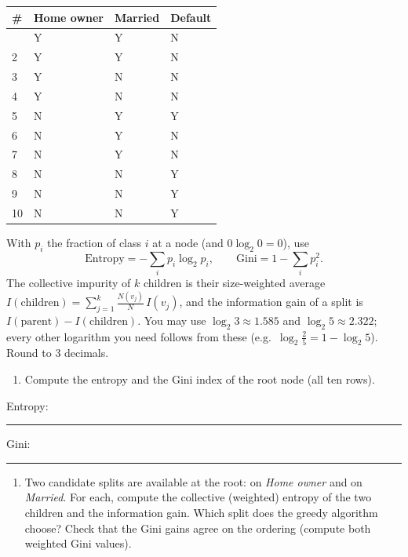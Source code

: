 \documentclass[
  11pt,
]{article}
\newcounter{none} %
\providecommand{\tightlist}{%
  \setlength{\itemsep}{0pt}\setlength{\parskip}{0pt}}
\newcommand{\answerspace}[1]{\par\vspace*{#1}}  %
\newcommand{\blank}[1][1.2in]{\rule{#1}{0.4pt}}
\newcommand{\answerpage}{\clearpage}
\begin{document}
{\def\LTcaptype{none} %
\begin{longtable}[]{@{}llll@{}}
\toprule\noalign{}
\# & Home owner & Married & Default \\
\midrule\noalign{}
\endhead
\bottomrule\noalign{}
\endlastfoot
1 & Y & Y & N \\
2 & Y & Y & N \\
3 & Y & N & N \\
4 & Y & N & N \\
5 & N & Y & Y \\
6 & N & Y & N \\
7 & N & Y & N \\
8 & N & N & Y \\
9 & N & N & Y \\
10 & N & N & Y \\
\end{longtable}
}

With \(p_i\) the fraction of class \(i\) at a node (and
\(0\log_2 0 = 0\)), use
\[\text{Entropy}=-\sum_i p_i\log_2 p_i,\qquad \text{Gini}=1-\sum_i p_i^2 .\]
The collective impurity of \(k\) children is their size-weighted average
\(I(\text{children})=\sum_{j=1}^{k}\frac{N(v_j)}{N}\,I(v_j)\), and the
information gain of a split is \(I(\text{parent})-I(\text{children})\).
You may use \(\log_2 3 \approx 1.585\) and \(\log_2 5 \approx 2.322\);
every other logarithm you need follows from these
(e.g.~\(\log_2\tfrac{2}{5} = 1 - \log_2 5\)). Round to 3 decimals.

\begin{enumerate}
\def\labelenumi{(\alph{enumi})}
\tightlist
\item
  Compute the entropy and the Gini index of the root node (all ten
  rows).
\end{enumerate}

Entropy: \blank[0.8in]\quad Gini: \blank[0.8in]

\answerspace{1.8in}
\answerpage

\begin{enumerate}
\def\labelenumi{(\alph{enumi})}
\setcounter{enumi}{1}
\tightlist
\item
  Two candidate splits are available at the root: on \emph{Home owner}
  and on \emph{Married}. For each, compute the collective (weighted)
  entropy of the two children and the information gain. Which split does
  the greedy algorithm choose? Check that the Gini gains agree on the
  ordering (compute both weighted Gini values).
\end{enumerate}
\end{document}
